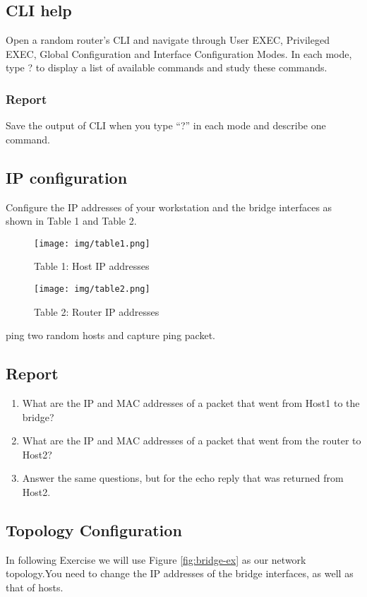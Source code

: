 \documentclass[10pt,a4paper]{article}
\numberwithin{equation}{section}
\numberwithin{figure}{section}
\numberwithin{table}{section}
\begin{document}
\subsection{CLI help}
    Open a random router’s CLI and navigate through User EXEC, Privileged EXEC, Global Configuration and Interface Configuration Modes. In each mode, type ? to display a list of available commands and study these commands.

\subsubsection*{Report}
 Save the output of CLI when you type “?” in each mode and describe one command.
    

\subsection{IP configuration}
    Configure the IP addresses of your workstation and the bridge interfaces as shown in Table 1 and Table 2.\\

    \begin{figure}[H]
        \centering
        \texttt{[image: img/table1.png]}
        \caption{Table 1: Host IP addresses}
        \label{tbl:table1}
        \texttt{[image: img/table2.png]}
        \caption{Table 2: Router IP addresses}
        \label{tbl:table2}
    \end{figure}

    ping two random hosts and capture ping packet.		

    \subsection*{Report}
    \begin{enumerate}
        \item What are the IP and MAC addresses of a packet that went from Host1 to the bridge? 
        \item What are the IP and MAC addresses of a packet that went from the router to Host2?
        \item Answer the same questions, but for the echo reply that was returned from Host2.
    \end{enumerate}

    
\subsection{Topology Configuration}
   In following Exercise we will use Figure \ref{fig:bridge-ex} as our network topology.You need to change the IP addresses of the bridge interfaces, as well as that of hosts.
\end{document}
